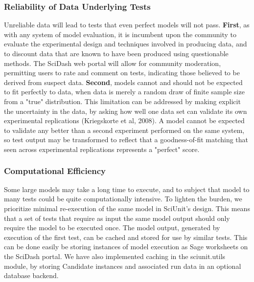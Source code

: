 \documentclass[11pt,letterpaper]{article}
\begin{document}
\subsubsection{Reliability of Data Underlying Tests}
Unreliable data will lead to tests that even perfect models will not pass. \textbf{First}, as with any system of model evaluation, it is incumbent upon the community to evaluate the experimental design and techniques involved in producing data, and to discount data that are known to have been produced using questionable methods.  The SciDash web portal will allow for community moderation, permitting users to rate and comment on tests, indicating those believed to be derived from suspect data.  \textbf{Second}, models cannot and should not be expected to fit perfectly to data, when data is merely a random draw of finite sample size from a "true" distribution.  This limitation can be addressed by making explicit the uncertainty in the data, by asking how well one data set can validate its own experimental replications (Kriegskorte et al, 2008).  A model cannot be expected to validate any better than a second experiment performed on the same system, so test output may be transformed to reflect that a goodness-of-fit matching that seen across experimental replications represents a "perfect" score.  

\subsubsection{Computational Efficiency}
Some large models may take a long time to execute, and to subject that model to many tests could be quite computationally intensive.  To lighten the burden, we prioritize minimal re-execution of the same model in SciUnit's design.  This means that a set of tests that require as input the same model output should only require the model to be executed once.  The model output, generated by execution of the first test, can be cached and stored for use by similar tests.  This can be done easily be storing instances of model execution as Sage worksheets on the SciDash portal.  We have also implemented caching in the sciunit.utils module, by storing Candidate instances and associated run data in an optional database backend.  
\end{document}
